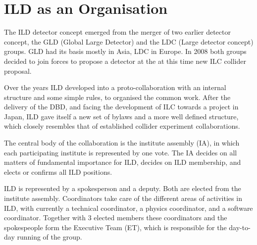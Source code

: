 \chapter{ILD as an Organisation}
\label{chap:organisation}

The ILD detector concept emerged from the merger of two earlier detector concept, the GLD (Global Large Detector) and the LDC (Large detector concept) groups. GLD had its basis mostly in Asia, LDC in Europe. In 2008 both groups decided to join forces to propose a detector at the at this time new ILC collider proposal. 

Over the years ILD developed into a proto-collaboration with an internal structure and some simple rules, to organised the common work. After the delivery of the DBD, and facing the development of ILC towards a project in Japan, ILD gave itself a new set of bylaws and a more well defined structure, which closely resembles that of established collider experiment collaborations. 

The central body of the collaboration is the institute assembly (IA), in which each participating institute is represented by one vote. The IA decides on all matters of fundamental importance for ILD, decides on ILD membership, and elects or confirms all ILD positions. 

ILD is represented by a spokesperson and a deputy. Both are elected from the institute assembly. Coordinators take care of the different areas of activities in ILD, with currently a technical coordinator, a physics coordinator, and a software coordinator. Together with 3 elected members these coordinators and the spokespeople form the Executive Team (ET), which is responsible for the day-to-day running of the group. 

